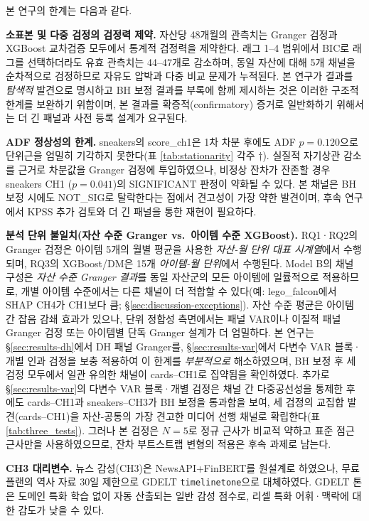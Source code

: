 \documentclass[11pt, a4paper, twocolumn]{article}
\begin{document}
본 연구의 한계는 다음과 같다.

\textbf{소표본 및 다중 검정의 검정력 제약.} 자산당 48개월의 관측치는
Granger 검정과 XGBoost 교차검증 모두에서 통계적 검정력을 제약한다.
래그 1--4 범위에서 BIC로 래그를 선택하더라도 유효 관측치는 44--47개로
감소하며, 동일 자산에 대해 5개 채널을 순차적으로 검정하므로 자유도
압박과 다중 비교 문제가 누적된다. 본 연구가 결과를 \emph{탐색적}
발견으로 명시하고 BH 보정 결과를 부록에 함께 제시하는 것은 이러한
구조적 한계를 보완하기 위함이며, 본 결과를 확증적(confirmatory) 증거로
일반화하기 위해서는 더 긴 패널과 사전 등록 설계가 요구된다.

\textbf{ADF 정상성의 한계.} sneakers의 \textsf{score\_ch1}은 1차 차분
후에도 ADF $p=0.120$으로 단위근을 엄밀히 기각하지 못한다(표
\ref{tab:stationarity} 각주 †). 실질적 자기상관 감소를 근거로 차분값을
Granger 검정에 투입하였으나, 비정상 잔차가 잔존할 경우 sneakers CH1
($p=0.041$)의 SIGNIFICANT 판정이 약화될 수 있다. 본 채널은 BH 보정
시에도 NOT\_SIG로 탈락한다는 점에서 견고성이 가장 약한 발견이며,
후속 연구에서 KPSS 추가 검토와 더 긴 패널을 통한 재현이 필요하다.

\textbf{분석 단위 불일치(자산 수준 Granger vs.\ 아이템 수준 XGBoost).}
RQ1·RQ2의 Granger 검정은 아이템 5개의 월별 평균을 사용한 \emph{자산-월
단위 대표 시계열}에서 수행되며, RQ3의 XGBoost/DM은 15개 \emph{아이템-월
단위}에서 수행된다. Model B의 채널 구성은 \emph{자산 수준 Granger
결과}를 동일 자산군의 모든 아이템에 일률적으로 적용하므로, 개별 아이템
수준에서는 다른 채널이 더 적합할 수 있다(예: \textsf{lego\_falcon}에서
SHAP CH4가 CH1보다 큼; \S\ref{sec:discussion-exceptions}). 자산 수준
평균은 아이템 간 잡음 감쇄 효과가 있으나, 단위 정합성 측면에서는
패널 VAR\citep{holtzeakinneweyrosen1988}이나 이질적 패널 Granger
검정\citep{dumitrescuhurlin2012} 또는 아이템별 단독 Granger 설계가
더 엄밀하다. 본 연구는 \S\ref{sec:results-dh}에서 DH 패널 Granger를,
\S\ref{sec:results-var}에서 다변수 VAR 블록·개별 인과 검정을
보충 적용하여 이 한계를 \emph{부분적으로} 해소하였으며, BH 보정 후
세 검정 모두에서 일관 유의한 채널이 cards--CH1로 집약됨을 확인하였다.
추가로 \S\ref{sec:results-var}의 다변수 VAR 블록·개별 검정은 채널 간
다중공선성을 통제한 후에도 cards--CH1과 sneakers--CH3가 BH 보정을
통과함을 보여, 세 검정의 교집합 발견(cards--CH1)을 자산-공통의 가장
견고한 미디어 선행 채널로 확립한다(표 \ref{tab:three_tests}).
그러나 본 검정은 $N=5$로 정규 근사가 비교적 약하고 표준 점근
근사만을 사용하였으므로, 잔차 부트스트랩 변형의 적용은 후속 과제로
남는다.

\textbf{CH3 대리변수.} 뉴스 감성(CH3)은 NewsAPI+FinBERT를 원설계로 하였으나,
무료 플랜의 역사 자료 30일 제한으로 GDELT \texttt{timelinetone}으로 대체하였다.
GDELT 톤은 도메인 특화 학습 없이 자동 산출되는 일반 감성 점수로, 리셀
특화 어휘·맥락에 대한 감도가 낮을 수 있다.
\end{document}
